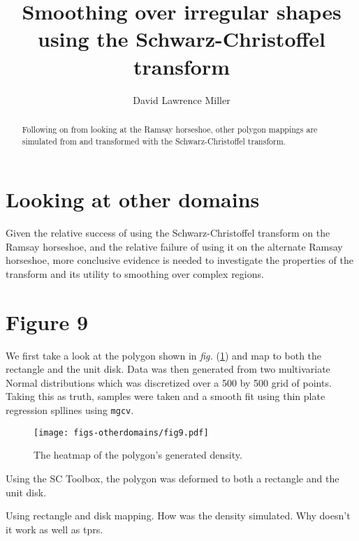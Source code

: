 \documentclass[a4paper,10pt]{amsart}
\title{Smoothing over irregular shapes using the Schwarz-Christoffel transform}
\author{David Lawrence Miller}
\newcommand{\sch}{Schwarz-Christoffel }
\newcommand{\fig}[1]{\emph{fig.} (\ref{#1})}
\begin{document}
\begin{abstract}
Following on from looking at the Ramsay horseshoe, other polygon mappings are simulated from and transformed with the \sch transform.
\end{abstract}


\newtheorem{thm}{Theorem}[section]

\newtheorem{defn}{Definition}[section]

\maketitle



\section{Looking at other domains}

Given the relative success of using the \sch transform on the Ramsay horseshoe, and the relative failure of using it on the alternate Ramsay horseshoe, more conclusive evidence is needed to investigate the properties of the transform and its utility to smoothing over complex regions.

\section{Figure 9}

We first take a look at the polygon shown in \fig{fig9} and map to both the rectangle and the unit disk. Data was then generated from two multivariate Normal distributions which was discretized over a 500 by 500 grid of points. Taking this as truth, samples were taken and a smooth fit using thin plate regression spllines using \texttt{mgcv}.


\begin{figure}
\centering
\texttt{[image: figs-otherdomains/fig9.pdf]} \\
\caption{The heatmap of the polygon's generated density.}
\label{fig9}
\end{figure}

Using the SC Toolbox, the polygon was deformed to both a rectangle and the unit disk. 


Using rectangle and disk mapping. How was the density simulated. Why doesn't it work as well as tprs.
\end{document}
